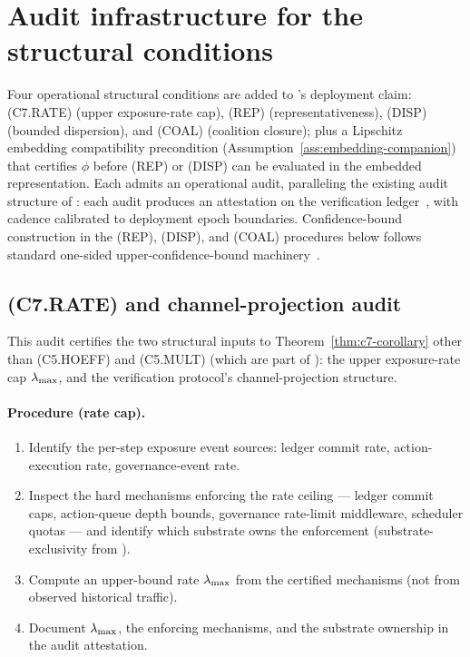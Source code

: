 \section{Audit infrastructure for the structural conditions}
\label{sec:audits}

Four operational structural conditions are added to
\citep[Deployment Safety]{lasser2026paper10}'s deployment claim:
(C7.RATE) (upper exposure-rate cap), (REP) (representativeness),
(DISP) (bounded dispersion), and (COAL) (coalition closure);
plus a Lipschitz embedding compatibility precondition
(Assumption~\ref{ass:embedding-companion}) that certifies $\phi$
before (REP) or (DISP) can be evaluated in the embedded
representation. Each admits an operational audit, paralleling the
existing audit structure of \citep[\S 8]{lasser2026paper10}: each
audit produces an attestation on the verification
ledger~\citep{lasser2026exo}, with cadence calibrated to
deployment epoch boundaries. Confidence-bound construction in the
(REP), (DISP), and (COAL) procedures below follows standard
one-sided upper-confidence-bound machinery~\citep{lehmann2005testing}.

\subsection{(C7.RATE) and channel-projection audit}

This audit certifies the two structural inputs to
Theorem~\ref{thm:c7-corollary} other than (C5.HOEFF) and
(C5.MULT) (which are part of \citep[Audit~7]{lasser2026paper10}):
the upper exposure-rate cap $\lambda_{\max}$, and the verification
protocol's channel-projection structure.

\paragraph{Procedure (rate cap).}
\begin{enumerate}
\item Identify the per-step exposure event sources: ledger commit
  rate, action-execution rate, governance-event rate.
\item Inspect the hard mechanisms enforcing the rate ceiling ---
  ledger commit caps, action-queue depth bounds, governance
  rate-limit middleware, scheduler quotas --- and identify which
  substrate owns the enforcement (substrate-exclusivity from
  \citep{lasser2026exo}).
\item Compute an upper-bound rate $\lambda_{\max}$ from the certified
  mechanisms (not from observed historical traffic).
\item Document $\lambda_{\max}$, the enforcing mechanisms, and the
  substrate ownership in the audit attestation.
\end{enumerate}


